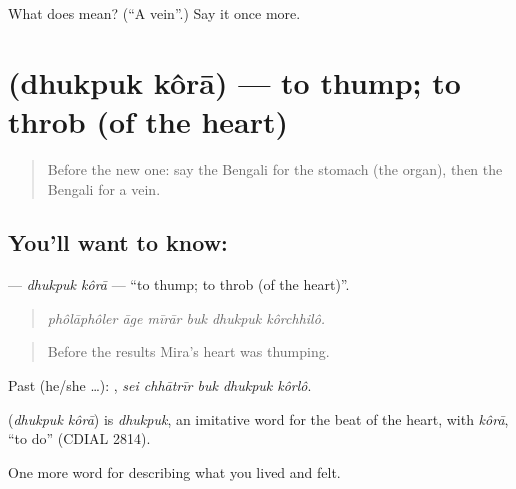 \begin{tcolorbox}[breakable,colback=teal!4,colframe=teal!35!black,title={Before you move on}]
What does  mean? (\textquotedblleft{}A vein\textquotedblright{}.) Say it once more.
\end{tcolorbox}
\section[\texorpdfstring{\bn{ধুকপুক} \bn{করা} (dhukpuk kôrā)}{ধুকপুক করা (dhukpuk kôrā)}]{  (dhukpuk kôrā) — to thump; to throb (of the heart)}

\label{lesson:BN-C468-dhukpuk-kora}



\begin{quote}
Before the new one: say the Bengali for the stomach (the organ), then the Bengali for a vein.
\end{quote}

\subsection*{You'll want to know:  }
\textbf{ } — \emph{dhukpuk kôrā} — \textquotedblleft{}to thump; to throb (of the heart)\textquotedblright{}.

\begin{quote}
     
\end{quote}

\begin{quote}
\emph{phôlāphôler āge mīrār buk dhukpuk kôrchhilô.}
\end{quote}

\begin{quote}
Before the results Mira's heart was thumping.
\end{quote}

Past (he/she …):     , \emph{sei chhātrīr buk dhukpuk kôrlô}.

\begin{cousinweb}
\textbf{ } (\emph{dhukpuk kôrā}) is \emph{dhukpuk}, an imitative word for the beat of the heart, with \emph{kôrā}, \textquotedblleft{}to do\textquotedblright{} (CDIAL 2814).
\end{cousinweb}

\begin{grammarlens}[title={What you've built}]
One more word for describing what you lived and felt.
\end{grammarlens}

